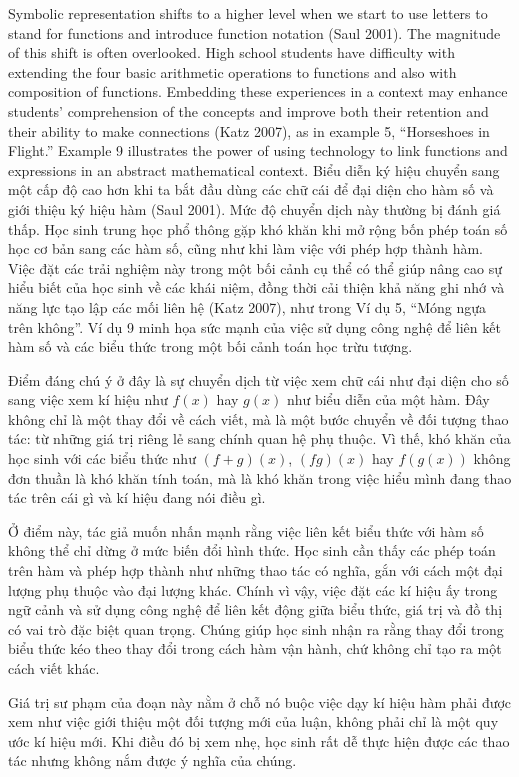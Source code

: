 \documentclass[
  10pt,
  a4paper,
  landscape,
  twoside,
  openany
]{scrbook}
\newcommand{\EN}[1]{#1}
\newcommand{\VI}[1]{#1}
\newcommand{\NOTE}[1]{#1}
\newcounter{example}
\begin{document}
\TriPara
{
\EN{Symbolic representation shifts to a higher level when we start to use letters to stand for functions and introduce function notation (Saul 2001). The magnitude of this shift is often overlooked. High school students have difficulty with extending the four basic arithmetic operations to functions and also with composition of functions. Embedding these experiences in a context may enhance students' comprehension of the concepts and improve both their retention and their ability to make connections (Katz 2007), as in example 5, ``Horseshoes in Flight.'' Example 9 illustrates the power of using technology to link functions and expressions in an abstract mathematical context.}
}
{
\VI{Biểu diễn ký hiệu chuyển sang một cấp độ cao hơn khi ta bắt đầu dùng các chữ cái để đại diện cho hàm số và giới thiệu ký hiệu hàm (Saul 2001). Mức độ chuyển dịch này thường bị đánh giá thấp. Học sinh trung học phổ thông gặp khó khăn khi mở rộng bốn phép toán số học cơ bản sang các hàm số, cũng như khi làm việc với phép hợp thành hàm. Việc đặt các trải nghiệm này trong một bối cảnh cụ thể có thể giúp nâng cao sự hiểu biết của học sinh về các khái niệm, đồng thời cải thiện khả năng ghi nhớ và năng lực tạo lập các mối liên hệ (Katz 2007), như trong Ví dụ 5, ``Móng ngựa trên không''. Ví dụ 9 minh họa sức mạnh của việc sử dụng công nghệ để liên kết hàm số và các biểu thức trong một bối cảnh toán học trừu tượng.}
}
{
\NOTE{Điểm đáng chú ý ở đây là sự chuyển dịch từ việc xem chữ cái như đại diện cho số sang việc xem kí hiệu như $f(x)$ hay $g(x)$ như biểu diễn của một hàm. Đây không chỉ là một thay đổi về cách viết, mà là một bước chuyển về đối tượng thao tác: từ những giá trị riêng lẻ sang chính quan hệ phụ thuộc. Vì thế, khó khăn của học sinh với các biểu thức như $(f+g)(x)$, $(fg)(x)$ hay $f(g(x))$ không đơn thuần là khó khăn tính toán, mà là khó khăn trong việc hiểu mình đang thao tác trên cái gì và kí hiệu đang nói điều gì.

Ở điểm này, tác giả muốn nhấn mạnh rằng việc liên kết biểu thức với hàm số không thể chỉ dừng ở mức biến đổi hình thức. Học sinh cần thấy các phép toán trên hàm và phép hợp thành như những thao tác có nghĩa, gắn với cách một đại lượng phụ thuộc vào đại lượng khác. Chính vì vậy, việc đặt các kí hiệu ấy trong ngữ cảnh và sử dụng công nghệ để liên kết động giữa biểu thức, giá trị và đồ thị có vai trò đặc biệt quan trọng. Chúng giúp học sinh nhận ra rằng thay đổi trong biểu thức kéo theo thay đổi trong cách hàm vận hành, chứ không chỉ tạo ra một cách viết khác.

Giá trị sư phạm của đoạn này nằm ở chỗ nó buộc việc dạy kí hiệu hàm phải được xem như việc giới thiệu một đối tượng mới của luận, không phải chỉ là một quy ước kí hiệu mới. Khi điều đó bị xem nhẹ, học sinh rất dễ thực hiện được các thao tác nhưng không nắm được ý nghĩa của chúng.}
}
\end{document}
